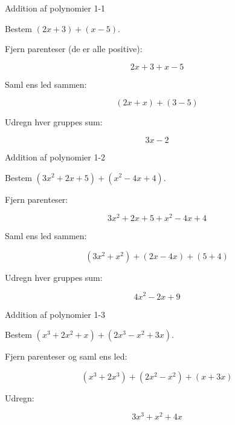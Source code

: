 \documentclass{article}
\begin{document}

\tableofcontents
\newpage

\begin{exercise}{Addition af polynomier 1-1}

Bestem $(2x + 3) + (x - 5)$.


\hint

Fjern parenteser (de er alle positive):

\hint
\[
2x + 3 + x - 5
\]

\hint

Saml ens led sammen:

\hint
\[
(2x + x) + (3 - 5)
\]

\hint

Udregn hver gruppes sum:

\hint
\[
3x - 2
\]

\end{exercise}

\newpage

\begin{exercise}{Addition af polynomier 1-2}

Bestem $(3x^2 + 2x + 5) + (x^2 - 4x + 4)$.


\hint

Fjern parenteser:

\hint
\[
3x^2 + 2x + 5 + x^2 - 4x + 4
\]

\hint

Saml ens led sammen:

\hint
\[
(3x^2 + x^2) + (2x - 4x) + (5 + 4)
\]

\hint

Udregn hver gruppes sum:

\hint
\[
4x^2 - 2x + 9
\]

\end{exercise}

\newpage

\begin{exercise}{Addition af polynomier 1-3}

Bestem $(x^3 + 2x^2 + x) + (2x^3 - x^2 + 3x)$.


\hint

Fjern parenteser og saml ens led:

\hint
\[
(x^3 + 2x^3) + (2x^2 - x^2) + (x + 3x)
\]

\hint

Udregn:

\hint
\[
3x^3 + x^2 + 4x
\]

\end{exercise}
\end{document}
